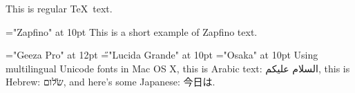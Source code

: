\documentclass[11pt]{article}
\begin{document}
This is regular \TeX\ text.

\font\zapf="Zapfino" at 10pt
{\zapf This is a short example of Zapfino text.}

\font\A="Geeza Pro" at 12pt
\font\H="Lucida Grande" at 10pt
\font\J="Osaka" at 10pt
Using multilingual Unicode fonts in Mac OS X, \newline
this is Arabic text: {\A السلام عليكم},
this is Hebrew: \newline
{\H שלום},
and here's some Japanese: {\J 今日は}.
\end{document}

